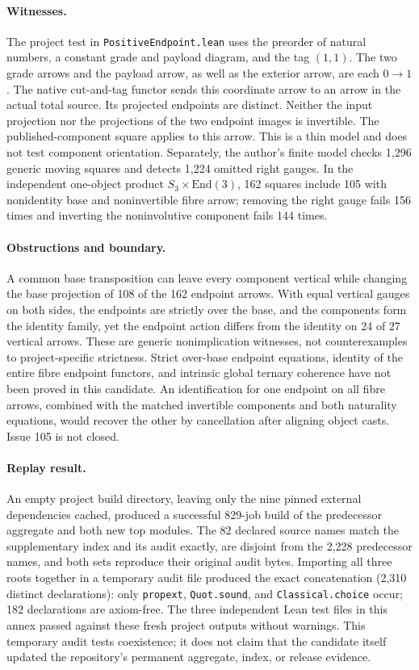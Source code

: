 \paragraph{Witnesses.} The project test in \texttt{PositiveEndpoint.lean} uses the preorder of natural numbers, a constant grade and payload diagram, and the tag $(1,1)$. The two grade arrows and the payload arrow, as well as the exterior arrow, are each $0\to1$. The native cut-and-tag functor sends this coordinate arrow to an arrow in the actual total source. Its projected endpoints are distinct. Neither the input projection nor the projections of the two endpoint images is invertible. The published-component square applies to this arrow. This is a thin model and does not test component orientation. Separately, the author's finite model checks 1,296 generic moving squares and detects 1,224 omitted right gauges. In the independent one-object product $S_3\times\mathrm{End}(3)$, 162 squares include 105 with nonidentity base and noninvertible fibre arrow; removing the right gauge fails 156 times and inverting the noninvolutive component fails 144 times.
\paragraph{Obstructions and boundary.} A common base transposition can leave every component vertical while changing the base projection of 108 of the 162 endpoint arrows. With equal vertical gauges on both sides, the endpoints are strictly over the base, and the components form the identity family, yet the endpoint action differs from the identity on 24 of 27 vertical arrows. These are generic nonimplication witnesses, not counterexamples to project-specific strictness. Strict over-base endpoint equations, identity of the entire fibre endpoint functors, and intrinsic global ternary coherence have not been proved in this candidate. An identification for one endpoint on all fibre arrows, combined with the matched invertible components and both naturality equations, would recover the other by cancellation after aligning object casts. Issue 105 is not closed.
\paragraph{Replay result.} An empty project build directory, leaving only the nine pinned external dependencies cached, produced a successful 829-job build of the predecessor aggregate and both new top modules. The 82 declared source names match the supplementary index and its audit exactly, are disjoint from the 2,228 predecessor names, and both sets reproduce their original audit bytes. Importing all three roots together in a temporary audit file produced the exact concatenation (2,310 distinct declarations): only \texttt{propext}, \texttt{Quot.sound}, and \texttt{Classical.choice} occur; 182 declarations are axiom-free. The three independent Lean test files in this annex passed against these fresh project outputs without warnings. This temporary audit tests coexistence; it does not claim that the candidate itself updated the repository's permanent aggregate, index, or release evidence.
